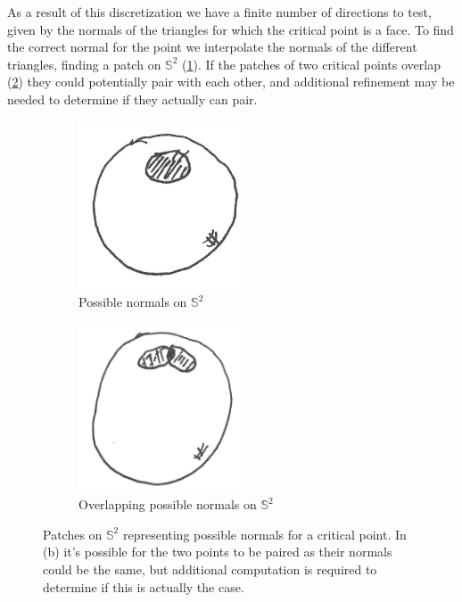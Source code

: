 \documentclass{article}
\begin{document}
As a result of this discretization we have a finite number of directions to test, given by
the normals of the triangles for which the critical point is a face. To find the correct normal
for the point we interpolate the normals of the different triangles, finding a patch on
$\mathbb{S}^2$ (\cref{fig:normals-patch}). If the patches of two critical points overlap
(\cref{fig:normals-patch-intersection})
they could potentially pair with each other, and additional refinement may be needed
to determine if they actually can pair.

\begin{figure}
	\centering
	\begin{subfigure}{0.45\columnwidth}
		\centering
		\includegraphics[height=5cm]{fig/normals-patch}
		\caption{\label{fig:normals-patch}Possible normals on $\mathbb{S}^2$}
	\end{subfigure}
	\begin{subfigure}{0.45\columnwidth}
		\centering
		\includegraphics[height=5cm]{fig/normals-patch-intersect}
		\caption{\label{fig:normals-patch-intersection}Overlapping possible normals on $\mathbb{S}^2$}
	\end{subfigure}
	\caption{\label{fig:normals-distrib} Patches on $\mathbb{S}^2$ representing possible
		normals for a critical point. In (b) it's possible for the two points to be paired
		as their normals could be the same, but additional computation is required to
		determine if this is actually the case.}
\end{figure}
\end{document}
